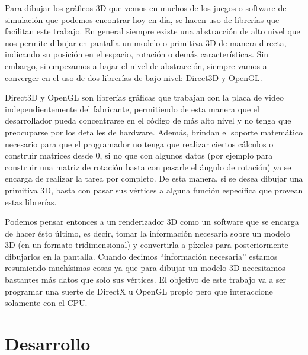 \documentclass[a4paper]{article}
\begin{document}
Para dibujar los gráficos 3D que vemos en muchos de los juegos o software de simulación que podemos encontrar hoy en día, se hacen uso de librerías que facilitan este trabajo. En general siempre existe una abstracción de alto nivel que nos permite dibujar en pantalla un modelo o primitiva 3D de manera directa, indicando su posición en el espacio, rotación o demás características. Sin embargo, si empezamos a bajar el nivel de abstracción, siempre vamos a converger en el uso de dos librerías de bajo nivel: Direct3D y OpenGL.
\par Direct3D y OpenGL son librerías gráficas que trabajan con la placa de video independientemente del fabricante, permitiendo de esta manera que el desarrollador pueda concentrarse en el código de más alto nivel y no tenga que preocuparse por los detalles de hardware. Además, brindan el soporte matemático necesario para que el programador no tenga que realizar ciertos cálculos o construir matrices desde 0, si no que con algunos datos (por ejemplo para construir una matriz de rotación basta con pasarle el ángulo de rotación) ya se encarga de realizar la tarea por completo. De esta manera, si se desea dibujar una primitiva 3D, basta con pasar sus vértices a alguna función específica que provean estas librerías.
\par Podemos pensar entonces a un renderizador 3D como un software que se encarga de hacer ésto último, es decir, tomar la información necesaria sobre un modelo 3D (en un formato tridimensional) y convertirla a píxeles para posteriormente dibujarlos en la pantalla. Cuando decimos ``información necesaria'' estamos resumiendo muchísimas cosas ya que para dibujar un modelo 3D necesitamos bastantes más datos que solo sus vértices. El objetivo de este trabajo va a ser programar una suerte de DirectX u OpenGL propio pero que interaccione solamente con el CPU.


\section{Desarrollo}
\end{document}
